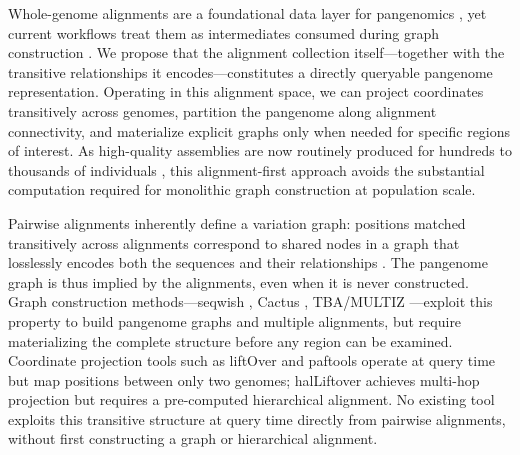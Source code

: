 
Whole-genome alignments are a foundational data layer for pangenomics \cite{computational2018, Eizenga2020b, Paten2017}, yet current workflows treat them as intermediates consumed during graph construction \cite{Garrison2024, Hickey2023}. We propose that the alignment collection itself---together with the transitive relationships it encodes---constitutes a directly queryable pangenome representation. Operating in this alignment space, we can project coordinates transitively across genomes, partition the pangenome along alignment connectivity, and materialize explicit graphs only when needed for specific regions of interest. As high-quality assemblies are now routinely produced for hundreds to thousands of individuals \cite{Liao2023, Wang2022}, this alignment-first approach avoids the substantial computation required for monolithic graph construction at population scale.

Pairwise alignments inherently define a variation graph: positions matched transitively across alignments correspond to shared nodes in a graph that losslessly encodes both the sequences and their relationships \cite{garrison2023seqwish}. The pangenome graph is thus implied by the alignments, even when it is never constructed. Graph construction methods---seqwish \cite{garrison2023seqwish}, Cactus \cite{Paten2011cactus}, TBA/MULTIZ \cite{Blanchette2004}---exploit this property to build pangenome graphs and multiple alignments, but require materializing the complete structure before any region can be examined. Coordinate projection tools such as liftOver \cite{Kuhn2013ucsc} and paftools \cite{Li2018minimap2} operate at query time but map positions between only two genomes; halLiftover \cite{Hickey2013hal} achieves multi-hop projection but requires a pre-computed hierarchical alignment. No existing tool exploits this transitive structure at query time directly from pairwise alignments, without first constructing a graph or hierarchical alignment.
